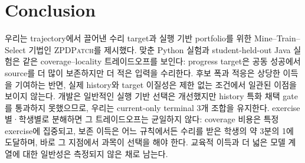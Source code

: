 \documentclass[10pt,conference]{IEEEtran}
\begin{document}
\section{Conclusion}
\label{sec:conclusion}
우리는 trajectory에서 끌어낸 수리 target과 실행 기반 portfolio를 위한 Mine--Train--Select 기법인 \textsc{ZPDPatch}를 제시했다. 맞춘 Python 실험과 student-held-out Java 실험은 같은 coverage--locality 트레이드오프를 보인다: progress target은 공동 성공에서 source를 더 많이 보존하지만 더 적은 입력을 수리한다. 후보 폭과 적응은 상당한 이득을 기여하는 반면, 실제 history와 target 이질성은 제한 없는 조건에서 일관된 이점을 보이지 않는다. 개발은 일반적인 실행 기반 선택은 개선했지만 history 특화 채택 gate를 통과하지 못했으므로, 우리는 current-only terminal 3개 조합을 유지한다. exercise별·학생별로 분해하면 그 트레이드오프는 균일하지 않다: coverage 비용은 특정 exercise에 집중되고, 보존 이득은 어느 규칙에서든 수리를 받은 학생의 약 3분의 1에 도달하며, 바로 그 지점에서 과목이 선택을 해야 한다. 교육적 이득과 더 넓은 모델 계열에 대한 일반성은 측정되지 않은 채로 남는다.
\end{document}
